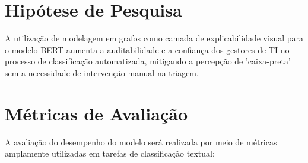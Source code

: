 \documentclass[
    12pt,                %
    openright,           %
    oneside,             %
    a4paper,             %
    english,             %
    brazil               %
]{abntex2}
\begin{document}
\vspace{0.5cm}

\begin{table}[htb]
    \centering
    \caption{Comparação entre trabalhos relacionados}
    \label{tab:trabalhos_relacionados}
    \vspace{0.2cm}
\end{table}

\section{Hipótese de Pesquisa}
\label{sec:hipotese_pesquisa}

A utilização de modelagem em grafos como camada de explicabilidade visual para o modelo BERT aumenta a auditabilidade e a confiança dos gestores de TI no processo de classificação automatizada, mitigando a percepção de 'caixa-preta' sem a necessidade de intervenção manual na triagem.

\section{Métricas de Avaliação}
\label{sec:metricas_avaliacao}

A avaliação do desempenho do modelo será realizada por meio de métricas 
amplamente utilizadas em tarefas de classificação textual:
\end{document}
